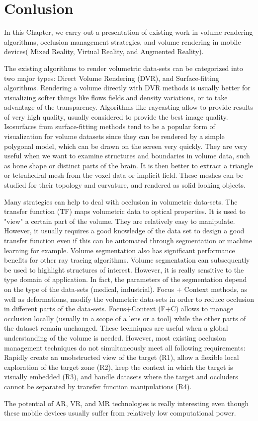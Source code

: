 \section{Conlusion}
In this Chapter, we carry out a presentation of existing work in volume rendering algorithms, occlusion management strategies, and volume rendering in mobile devices( Mixed Reality, Virtual Reality, and Augmented Reality).

 The existing algorithms to render volumetric data-sets can be categorized into two major types: Direct Volume Rendering (DVR), and Surface-fitting algorithms. Rendering a volume directly with DVR methods is usually better for visualizing softer things like flows fields and density variations, or to take advantage of the transparency. Algorithms like raycasting allow to provide results of very high quality, usually considered to provide the best image quality. 
Isosurfaces from surface-fitting methods tend to be a popular form of visualization for volume datasets since they can be rendered by a simple polygonal model, which can be drawn on the screen very quickly. They are very useful when we want to examine structures and boundaries in volume data, such as bone shape or distinct parts of the brain. It is then better to extract a triangle or tetrahedral mesh from the voxel data or implicit field. These meshes can be studied for their topology and curvature, and rendered as solid looking objects.


Many strategies can help to deal with occlusion in volumetric data-sets. The transfer function (TF) maps volumetric data to optical properties. It is used to "view" a certain part of the volume. They are relatively easy to manipulate. However, it usually requires a good knowledge of the data set to design a good transfer function even if this can be automated through segmentation or machine learning for example. Volume segmentation also has significant performance benefits for other ray tracing algorithms. Volume segmentation can subsequently be used to highlight structures of interest. However, it is really sensitive to the type domain of application. In fact, the parameters of the segmentation depend on the type of the data-sets (medical, industrial).  Focus + Context methods, as well as deformations, modify the volumetric data-sets in order to reduce occlusion in different parts of the data-sets. Focus+Context (F+C) allows to manage occlusion locally (usually in a scope of a lens or a tool) while the other parts of the dataset remain unchanged. These techniques are useful when a global understanding of the volume is needed. However, most existing occlusion management techniques do not simultaneously meet all following requirements: Rapidly create an unobstructed view of the target (R1), allow a flexible local exploration of the target zone (R2), keep the context in which the target is visually embedded (R3), and handle datasets where the target and occluders cannot 
be separated by transfer function manipulations (R4).


 The potential of AR, VR, and MR technologies is really interesting even though these mobile devices usually suffer from relatively low computational power.   